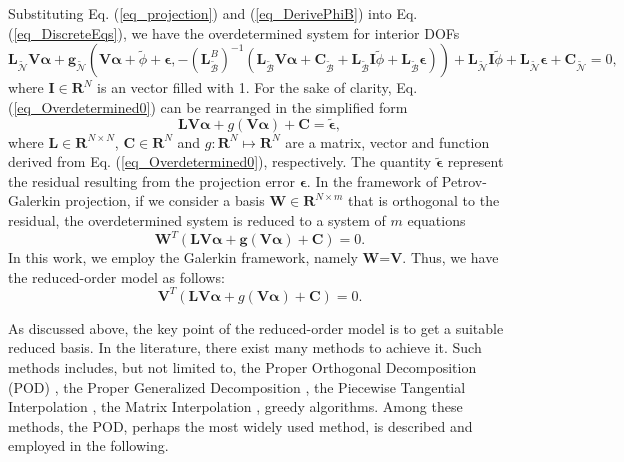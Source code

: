 \documentclass[preprint, 10pt]{elsarticle}
\begin{document}
Substituting Eq. (\ref{eq_projection}) and (\ref{eq_DerivePhiB}) into Eq. (\ref{eq_DiscreteEqs}), we have the overdetermined system for interior
DOFs
\begin{equation}
\mathbf{L}_{\widetilde {\mathcal{N}}} \mathbf{V} \pmb{\alpha}
+\mathbf{g}_{\widetilde {\mathcal{N}}}
\left( \mathbf{V} \pmb{\alpha} + \tilde{\phi} + \pmb{\epsilon}, -\left( \mathbf{L}_{\widetilde {\mathcal{B}}}^{B} \right)^{-1}
\left(
\mathbf{L}_{\widetilde {\mathcal{B}}} \mathbf{V} \pmb{\alpha} +
\mathbf{C}_{\widetilde {\mathcal{B}}} + \mathbf{L}_{\widetilde {\mathcal{B}}} \mathbf{I} \tilde{\phi} + \mathbf{L}_{\widetilde {\mathcal{B}}} \pmb{\epsilon}
\right) \right)
+\mathbf{L}_{\widetilde {\mathcal{N}}} \mathbf{I} \tilde{\phi}
+\mathbf{L}_{\widetilde {\mathcal{N}}} \pmb{\epsilon}
+ \mathbf{C}_{\widetilde {\mathcal{N}}}
= 0,
\label{eq_Overdetermined0}
\end{equation}
where $\mathbf{I} \in \mathbf{R}^{N}$ is an vector filled with 1. For the sake of clarity, Eq. (\ref{eq_Overdetermined0}) can be rearranged in the simplified form
\begin{equation}
 \mathbf{L} \mathbf{V} \pmb{\alpha}
+ g         \left( \mathbf{V} \pmb{\alpha} \right)
+\mathbf{C}
= \tilde{ \pmb{\epsilon} },
\label{eq_Overdetermined1}
\end{equation}
where $\mathbf{L} \in \mathbf{R}^{N \times N}$, $\mathbf{C} \in \mathbf{R}^{N}$ and $g: \mathbf{R}^N \mapsto \mathbf{R}^N$ are a matrix, vector and function derived from Eq. (\ref{eq_Overdetermined0}), respectively.
The quantity $\tilde{ \pmb{\epsilon} }$ represent the residual resulting from the projection error $\pmb{\epsilon}$.
In the framework of Petrov-Galerkin projection, if we consider a basis $\mathbf{W} \in \mathbf{R}^{N \times m}$ that is orthogonal to the residual,  the overdetermined system is reduced to a system of $m$ equations
\begin{equation}
\mathbf{W}^T
\left(
 \mathbf{L} \mathbf{V} \pmb{\alpha}
+\mathbf{g} \left( \mathbf{V} \pmb{\alpha} \right)
+\mathbf{C}
\right)
=0.
\label{eq_Petrov}
\end{equation}
In this work, we employ the Galerkin framework, namely $\mathbf{W}$=$\mathbf{V}$.
Thus, we have the reduced-order model as follows:
\begin{equation}
\mathbf{V}^T
\left(
 \mathbf{L} \mathbf{V} \pmb{\alpha}
+ g         \left( \mathbf{V} \pmb{\alpha} \right)
+\mathbf{C}
\right)
=0.
\label{eq_Galerkin}
\end{equation}

As discussed above, the key point of the reduced-order model is to get a suitable reduced basis. In the literature, there exist many methods to achieve it. Such methods includes, but not limited to, the Proper Orthogonal Decomposition (POD) \cite{hesthaven2016certified,liang2002proper,quarteroni2015reduced}, the  Proper Generalized Decomposition \cite{chinesta2011short}, the Piecewise Tangential Interpolation \cite{gallivan2002model}, the Matrix Interpolation \cite{panzer2010parametric}, greedy algorithms\cite{billaud2017dynamical, lappano2016greedy, hesthaven2014efficient}.
Among these methods, the POD, perhaps the most widely used method, is described and employed in the following.
\end{document}
